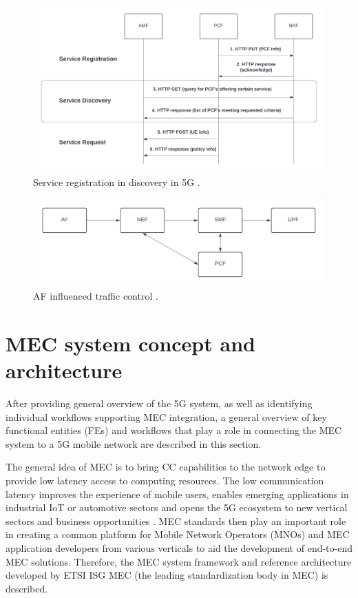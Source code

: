 \documentclass[12pt,a4paper,twoside]{report}
\begin{document}
\begin{figure}[ht]
	\centering
	\includegraphics[width=\textwidth]{./images/5G-reg-disc.png}
	\caption{Service registration in discovery in 5G \cite{rommer20195g}.}
	\label{F:service-reg-disc}
\end{figure}

\begin{figure}[ht]
	\centering
	\includegraphics[width=15cm]{./images/traffic-control.png}
	\caption{AF influenced traffic control \cite{rommer20195g}.}
	\label{F:traffic-control}
\end{figure}

\section{MEC system concept and architecture}
After providing general overview of the 5G system, as well as identifying individual workflows supporting MEC integration, a general overview of key functional entities (FEs) and workflows that play a role in connecting the MEC system to a 5G mobile network are described in this section.

The general idea of MEC is to bring CC capabilities to the network edge to provide low latency access to computing resources. The low communication latency improves the experience of mobile users, enables emerging applications in industrial IoT or automotive sectors \cite{ETSI:wp36} and opens the 5G ecosystem to new vertical sectors and business opportunities \cite{sabella-mec-sw-dev}.  MEC standards then play an important role in creating a common platform for Mobile Network Operators (MNOs) and MEC application developers from various verticals to aid the development of end-to-end MEC solutions. Therefore, the MEC system framework and reference architecture developed by ETSI ISG MEC (the leading standardization body in MEC) is described.
\end{document}
